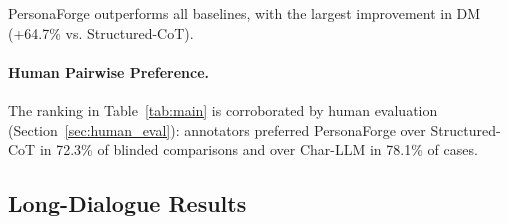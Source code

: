 \documentclass[11pt]{article}
\begin{document}
\begin{CJK*}{UTF8}{gbsn}
\begin{table}[t]
\centering
\small
{}
\caption{Main results. PC=LLM-as-Judge score. $\pm$=95\% CI. All vs. S-CoT: $p<0.01$.}
\label{tab:main}
\end{table}

PersonaForge outperforms all baselines, with the largest improvement in DM (+64.7\% vs. Structured-CoT).

\paragraph{Human Pairwise Preference.} The ranking in Table~\ref{tab:main} is corroborated by human evaluation (Section~\ref{sec:human_eval}): annotators preferred PersonaForge over Structured-CoT in 72.3\% of blinded comparisons and over Char-LLM in 78.1\% of cases.

\subsection{Long-Dialogue Results}

\begin{table}[t]
\centering
\small
{}
\caption{Long-dialogue (50 turns). Drift=\% turns PC$<$0.6. Recov.=\% recovering to PC$\geq$0.7 within 5 turns.}
\label{tab:longdialogue}
\end{table}


\end{CJK*}
\end{document}
